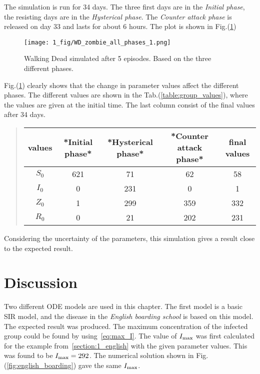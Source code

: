 \documentclass[%
twoside,                 %
final,                   %
chapterprefix=true,      %
open=right               %
10pt]{book}
\begin{document}
\noindent
The simulation is run for 34 days. The three first days are in the \emph{Initial phase}, the resisting days are in the \emph{Hysterical phase}. The \emph{Counter attack phase} is released on day 33 and lasts for about 6 hours. The plot is shown in Fig.(\ref{fig:all_phases})   


\begin{figure}[ht]
  \centerline{\texttt{[image: 1\_fig/WD\_zombie\_all\_phases\_1.png]}}
  \caption{
  \label{fig:all_phases} Walking Dead simulated after 5 episodes. Based on the three different phases.
  }
\end{figure}


Fig.(\ref{fig:all_phases}) clearly shows that the change in parameter values affect the different phases. The different values are shown in the Tab.(\ref{table:group_values}), where the values are given at the initial time. The last column consist of the final values after 34 days.

\label{table:group_values}

\begin{quote}
\begin{tabular}{ccccc}
\hline
\multicolumn{1}{c}{ values } & \multicolumn{1}{c}{ *Initial phase* } & \multicolumn{1}{c}{ *Hysterical phase* } & \multicolumn{1}{c}{ *Counter attack phase* } & \multicolumn{1}{c}{ final values } \\
\hline
$S_0$  & 621             & 71                 & 62                     & 58           \\
$I_0$  & 0               & 231                & 0                      & 1            \\
$Z_0$  & 1               & 299                & 359                    & 332          \\
$R_0$  & 0               & 21                 & 202                    & 231          \\
\hline
\end{tabular}
\end{quote}

\noindent
Considering the uncertainty of the parameters, this simulation gives a result close to the expected result. 


\vspace{3mm}




\vspace{3mm}



\section{Discussion}
Two different ODE models are used in this chapter. The first model is a basic SIR model, and the disease in the \emph{English boarding school} is based on this model. The expected result was produced. The maximum concentration of the infected group could be found by using~\ref{eq:max_I}. The value of $I_{\textrm{max}}$ was first calculated for the example from~\ref{section:1_english} with the given parameter values. This was found to be $I_{\textrm{max}}=292$. The numerical solution shown in Fig.(\ref{fig:english_boarding}) gave the same $I_{\textrm{max}}$. 
\end{document}
